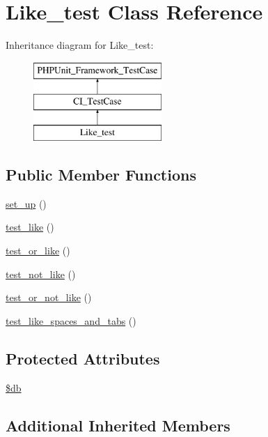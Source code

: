 \hypertarget{class_like__test}{}\section{Like\+\_\+test Class Reference}
\label{class_like__test}
Inheritance diagram for Like\+\_\+test\+:\begin{figure}[H]
\begin{center}
\leavevmode
\includegraphics[height=3.000000cm]{class_like__test}
\end{center}
\end{figure}
\subsection*{Public Member Functions}
\begin{DoxyCompactItemize}
\item 
\hyperlink{class_like__test_a69829875c8d4b6ce94908445c4155741}{set\+\_\+up} ()
\item 
\hyperlink{class_like__test_afb06f2d324bd6b68405393e2888dd52c}{test\+\_\+like} ()
\item 
\hyperlink{class_like__test_a2cedb2a37aab4931a7e1019ec5b1a6c6}{test\+\_\+or\+\_\+like} ()
\item 
\hyperlink{class_like__test_a9cb780a50f9a2df087ea7f5e6f63f763}{test\+\_\+not\+\_\+like} ()
\item 
\hyperlink{class_like__test_afa2d0225fc6ade6e7bfc4c51251a9c6b}{test\+\_\+or\+\_\+not\+\_\+like} ()
\item 
\hyperlink{class_like__test_a367816e336c2490cd5aac6f9ff728de3}{test\+\_\+like\+\_\+spaces\+\_\+and\+\_\+tabs} ()
\end{DoxyCompactItemize}
\subsection*{Protected Attributes}
\begin{DoxyCompactItemize}
\item 
\hyperlink{class_like__test_a1fa3127fc82f96b1436d871ef02be319}{\$db}
\end{DoxyCompactItemize}
\subsection*{Additional Inherited Members}


